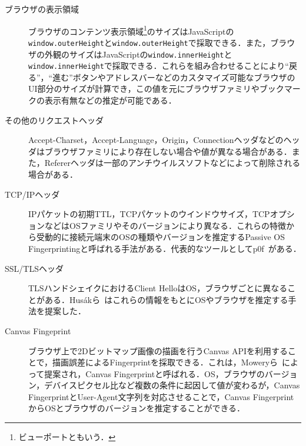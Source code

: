 \begin{description}
\item[ブラウザの表示領域]ブラウザのコンテンツ表示領域\footnote{ビューポートともいう．}のサイズはJavaScriptの\texttt{window.outerHeight}と\texttt{window.outerHeight}で採取できる．また，ブラウザの外観のサイズはJavaScriptの\texttt{window.innerHeight}と\texttt{window.innerHeight}で採取できる．これらを組み合わせることにより``戻る''，``進む''ボタンやアドレスバーなどのカスタマイズ可能なブラウザのUI部分のサイズが計算でき，この値を元にブラウザファミリやブックマークの表示有無などの推定が可能である．
\item[その他のリクエストヘッダ]Accept-Charset，Accept-Language，Origin，Connectionヘッダなどのヘッダはブラウザファミリにより存在しない場合や値が異なる場合がある．また，Refererヘッダは一部のアンチウイルスソフトなどによって削除される場合がある．
\item[TCP/IPヘッダ]IPパケットの初期TTL，TCPパケットのウインドウサイズ，TCPオプションなどはOSファミリやそのバージョンにより異なる．これらの特徴から受動的に接続元端末のOSの種類やバージョンを推定するPassive OS Fingerprintingと呼ばれる手法がある．代表的なツールとしてp0f~\cite{p0f}がある．
\item[SSL/TLSヘッダ]TLSハンドシェイクにおけるClient HelloはOS，ブラウザごとに異なることがある．Hus{\'a}kら~\cite{husak2016https}はこれらの情報をもとにOSやブラウザを推定する手法を提案した．
\item[Canvas Fingeprint]ブラウザ上で2Dビットマップ画像の描画を行うCanvas APIを利用することで，描画誤差によるFingerprintを採取できる．これは，Moweryら~\cite{mowery2012pixel}によって提案され，Canvas Fingerprintと呼ばれる．OS，ブラウザのバージョン，デバイスピクセル比など複数の条件に起因して値が変わるが，Canvas FingerprintとUser-Agent文字列を対応させることで，Canvas FingerprintからOSとブラウザのバージョンを推定することができる．
\end{description}
